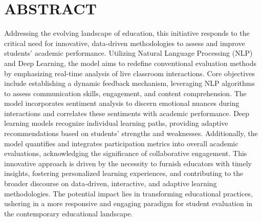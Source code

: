 \chapter*{ABSTRACT}
Addressing the evolving landscape of education, this initiative responds to the critical need for innovative, data-driven methodologies to assess and improve students' academic performance. Utilizing Natural Language Processing (NLP) and Deep Learning, the model aims to redefine conventional evaluation methods by emphasizing real-time analysis of live classroom interactions. Core objectives include establishing a dynamic feedback mechanism, leveraging NLP algorithms to assess communication skills, engagement, and content comprehension. The model incorporates sentiment analysis to discern emotional nuances during interactions and correlates these sentiments with academic performance. Deep learning models recognize individual learning paths, providing adaptive recommendations based on students' strengths and weaknesses. Additionally, the model quantifies and integrates participation metrics into overall academic evaluations, acknowledging the significance of collaborative engagement. This innovative approach is driven by the necessity to furnish educators with timely insights, fostering personalized learning experiences, and contributing to the broader discourse on data-driven, interactive, and adaptive learning methodologies. The potential impact lies in transforming educational practices, ushering in a more responsive and engaging paradigm for student evaluation in the contemporary educational landscape.





